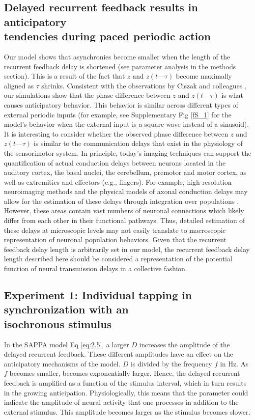 \documentclass{report}
\begin{document}
\subsection{Delayed recurrent feedback results in anticipatory \\ tendencies during paced periodic action}

Our model shows that asynchronies become smaller when the length of the recurrent feedback delay is shortened (see parameter analysis in the methods section). This is a result of the fact that $z$ and $z(t—\tau)$ become maximally aligned as $\tau$ shrinks. Consistent with the observations by Ciszak and colleagues \cite{ciszak2004dynamical}, our simulations show that the phase difference between $z$ and $z(t—\tau)$ is what causes anticipatory behavior. This behavior is similar across different types of external periodic inputs (for example, see Supplementary Fig \ref{fS_1} for the model's behavior when the external input is a square wave instead of a sinusoid). It is interesting to consider whether the observed phase difference between $z$ and $z(t—\tau)$ is similar to the communication delays that exist in the physiology of the sensorimotor system. In principle, today's imaging techniques can support the quantification of actual conduction delays between neurons located in the auditory cortex, the basal nuclei, the cerebellum, premotor and motor cortex, as well as extremities and effectors (e.g., fingers). For example, high resolution neuroimaging methods and the physical models of axonal conduction delays may allow for the estimation of these delays through integration over populations \cite{swadlow2012axonal}. However, these areas contain vast numbers of neuronal connections which likely differ from each other in their functional pathways. Thus, detailed estimation of these delays at microscopic levels may not easily translate to macroscopic representation of neuronal population behaviors. Given that the recurrent feedback delay length is arbitrarily set in our model, the recurrent feedback delay length described here should be considered a representation of the potential function of neural transmission delays in a collective fashion.

\subsection{Experiment 1: Individual tapping in synchronization with an \\ isochronous stimulus}

In the SAPPA model Eq \eqref{eq:2.5}, a larger $D$ increases the amplitude of the delayed recurrent feedback. These different amplitudes have an effect on the anticipatory mechanisms of the model. $D$ is divided by the frequency $f$ in Hz. As $f$ becomes smaller, becomes exponentially larger. Hence, the delayed recurrent feedback is amplified as a function of the stimulus interval, which in turn results in the growing anticipation. Physiologically, this means that the parameter could indicate the amplitude of neural activity that one processes in addition to the external stimulus. This amplitude becomes larger as the stimulus becomes slower.
\end{document}
